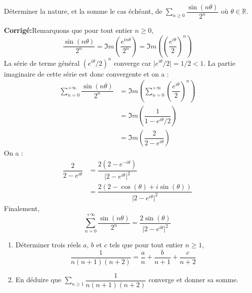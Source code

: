\documentclass[a4paper,twoside,french,10pt]{VcCours}
\newcommand{\corr}{\textbf{Corrigé:}}
\newcommand{\Sum}[2]{\ensuremath{\textstyle{\sum\limits_{#1}^{#2}}}}
\begin{document}
\medskip

\begin{Exercice}{} Déterminer la nature, et la somme le cas échéant, de $\Sum{n \geq 0}{} \dfrac{\sin(n \theta)}{2^n}$ où $\theta \in \mathbb{R}$.
\end{Exercice}

\corr Remarquons que pour tout entier $n \geq 0$,
$$ \dfrac{\sin(n \theta)}{2^n} = \Im m \left( \dfrac{e^{i n\theta}}{2^n} \right) = \Im m \left(\left( \dfrac{e^{i \theta}}{2} \right)^n \right)$$
La série de terme général $(e^{i \theta}/2)^n$ converge car $\vert e^{i \theta}/2 \vert = 1/2 <1$. La partie imaginaire de cette série est donc convergente et on a :
\begin{align*}
\sum_{n=0}^{+ \infty}  \dfrac{\sin(n \theta)}{2^n}  & = \Im m \left( \sum_{n=0}^{+ \infty} \left( \dfrac{e^{i \theta}}{2} \right)^n \right) \\
& = \Im m \left( \dfrac{1}{1-e^{i \theta}/2} \right) \\
& = \Im m \left( \dfrac{2}{2- e^{i \theta}} \right)
\end{align*}
On a :
\begin{align*}
\dfrac{2}{2- e^{i \theta}} & = \dfrac{2(2-e^{- i\theta})}{\vert 2- e^{i \theta} \vert^2} \\
& = \dfrac{2(2- \cos(\theta)+i \sin(\theta))}{\vert 2- e^{i \theta} \vert^2}
\end{align*}
Finalement,
$$ \sum_{n=0}^{+ \infty}  \dfrac{\sin(n \theta)}{2^n} = \dfrac{2\sin(\theta)}{\vert 2- e^{i \theta} \vert^2}$$

\medskip


\begin{Exercice}{} 
\begin{enumerate}
\item Déterminer trois réels $a$, $b$ et $c$ tels que pour tout entier $n \geq 1$,
$$ \frac{1}{n(n+1)(n+2)} = \frac{a}{n} + \frac{b}{n+1} + \frac{c}{n+2}$$
\item En déduire que $\Sum{n \geq 1}{} \dfrac{1}{n(n+1)(n+2)}$ converge et donner sa somme.
\end{enumerate}
\end{Exercice}
\end{document}
